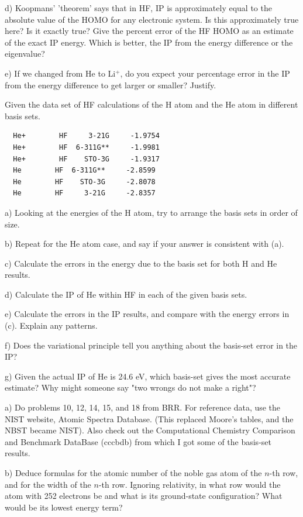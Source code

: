 d) Koopmans' 'theorem' says that in HF, IP is approximately equal to the absolute value
of the HOMO for any electronic system.  Is this approximately true here?  Is
it exactly true?  Give the percent error of the HF HOMO as an estimate
of the exact IP energy.  Which is better, the IP from the energy difference
or the eigenvalue?

e) If we changed from He to Li$^+$, do you expect your percentage error in the
IP from the energy difference to get larger or smaller?  Justify. 
\newpage
{}

Given the data set of HF calculations of the H atom and the He atom in different
basis sets.
\begin{verbatim}
  He+        HF     3-21G     -1.9754
  He+        HF  6-311G**     -1.9981
  He+        HF    STO-3G     -1.9317
  He        HF  6-311G**     -2.8599
  He        HF    STO-3G     -2.8078
  He        HF     3-21G     -2.8357
\end{verbatim}

a) Looking at the energies of the H atom, try to arrange the basis sets in order
of size.

b) Repeat for the He atom case, and say if your answer is consistent with (a).

c) Calculate the errors in the energy due to the basis set for both H and He results.

d) Calculate the IP of He within HF in each of the given basis sets.

e) Calculate the errors in the IP results, and compare with the energy errors in (c).
Explain any patterns.

f) Does the variational principle tell you anything about the basis-set error in the IP?

g) Given the actual IP of He is 24.6 eV, which basis-set gives the most accurate estimate?
Why might someone say "two wrongs do not make a right"?
\newpage
{}

a) Do problems 10, 12, 14, 15, and 18 from BRR.   For reference data, use the NIST website,
Atomic Spectra Database. (This replaced Moore's tables, and the NBST became NIST).
Also check out the Computational Chemistry Comparison and Benchmark DataBase (cccbdb)
from which I got some of the basis-set results.

b) Deduce formulas for the atomic number of the noble gas atom
of the $n$-th row, and for the width of the $n$-th row.  Ignoring
relativity, in what row would the atom with 252 electrons be and
what is its ground-state configuration?  What would be its lowest
energy term?

